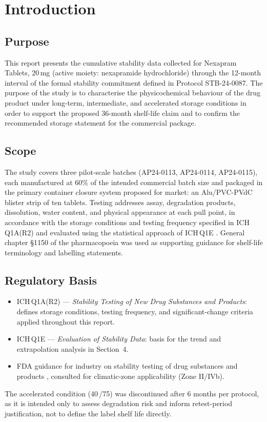 \section{Introduction}

\subsection{Purpose}
This report presents the cumulative stability data collected for Nexapram Tablets, 20\,mg
(active moiety: nexapramide hydrochloride) through the 12-month interval of the formal
stability commitment defined in Protocol STB-24-0087. The purpose of the study is to
characterise the physicochemical behaviour of the drug product under long-term,
intermediate, and accelerated storage conditions in order to support the proposed
36-month shelf-life claim and to confirm the recommended storage statement for the
commercial package.

\subsection{Scope}
The study covers three pilot-scale batches (AP24-0113, AP24-0114, AP24-0115), each
manufactured at 60\% of the intended commercial batch size and packaged in the primary
container closure system proposed for market: an Alu/PVC-PVdC blister strip of ten
tablets. Testing addresses assay, degradation products, dissolution, water content,
and physical appearance at each pull point, in accordance with the storage conditions
and testing frequency specified in ICH\,Q1A(R2) \citep{ich_q1a} and evaluated using the
statistical approach of ICH\,Q1E \citep{ich_q1e}. General chapter \S1150 of the
pharmacopoeia \citep{usp1150} was used as supporting guidance for shelf-life
terminology and labelling statements.

\subsection{Regulatory Basis}
\begin{itemize}
  \item ICH\,Q1A(R2) --- \textit{Stability Testing of New Drug Substances and Products}: defines
        storage conditions, testing frequency, and significant-change criteria applied
        throughout this report.
  \item ICH\,Q1E --- \textit{Evaluation of Stability Data}: basis for the trend and
        extrapolation analysis in Section~4.
  \item FDA guidance for industry on stability testing of drug substances and products
        \citep{fda_guidance}, consulted for climatic-zone applicability (Zone II/IVb).
\end{itemize}

\begin{noteboxx}
The accelerated condition (40\,\degC/75\RH) was discontinued after 6 months per protocol,
as it is intended only to assess degradation risk and inform retest-period justification,
not to define the label shelf life directly.
\end{noteboxx}
